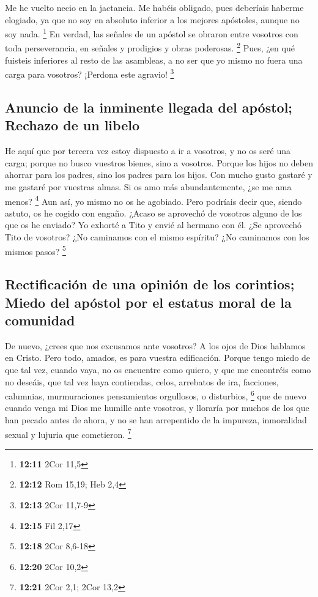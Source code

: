 \begin{paracol}{2}
 Me he vuelto necio en la jactancia. Me habéis obligado,
pues deberíais haberme elogiado, ya que no soy en absoluto inferior a
los mejores apóstoles, aunque no soy nada. \footnote{\textbf{12:11} 2Cor
  11,5}  En verdad, las señales de un apóstol se obraron
entre vosotros con toda perseverancia, en señales y prodigios y obras
poderosas. \footnote{\textbf{12:12} Rom 15,19; Heb 2,4} 
Pues, ¿en qué fuisteis inferiores al resto de las asambleas, a no ser
que yo mismo no fuera una carga para vosotros? ¡Perdona este agravio!
\footnote{\textbf{12:13} 2Cor 11,7-9}

\hypertarget{anuncio-de-la-inminente-llegada-del-apuxf3stol-rechazo-de-un-libelo}{%
\subsection{Anuncio de la inminente llegada del apóstol; Rechazo de un
libelo}\label{anuncio-de-la-inminente-llegada-del-apuxf3stol-rechazo-de-un-libelo}}

 He aquí que por tercera vez estoy dispuesto a ir a
vosotros, y no os seré una carga; porque no busco vuestros bienes, sino
a vosotros. Porque los hijos no deben ahorrar para los padres, sino los
padres para los hijos.  Con mucho gusto gastaré y me
gastaré por vuestras almas. Si os amo más abundantemente, ¿se me ama
menos? \footnote{\textbf{12:15} Fil 2,17}  Aun así, yo
mismo no os he agobiado. Pero podríais decir que, siendo astuto, os he
cogido con engaño.  ¿Acaso se aprovechó de vosotros
alguno de los que os he enviado?  Yo exhorté a Tito y
envié al hermano con él. ¿Se aprovechó Tito de vosotros? ¿No caminamos
con el mismo espíritu? ¿No caminamos con los mismos pasos? \footnote{\textbf{12:18}
  2Cor 8,6-18}

\hypertarget{rectificaciuxf3n-de-una-opiniuxf3n-de-los-corintios-miedo-del-apuxf3stol-por-el-estatus-moral-de-la-comunidad}{%
\subsection{Rectificación de una opinión de los corintios; Miedo del
apóstol por el estatus moral de la
comunidad}\label{rectificaciuxf3n-de-una-opiniuxf3n-de-los-corintios-miedo-del-apuxf3stol-por-el-estatus-moral-de-la-comunidad}}

 De nuevo, ¿crees que nos excusamos ante vosotros? A los
ojos de Dios hablamos en Cristo. Pero todo, amados, es para vuestra
edificación.  Porque tengo miedo de que tal vez, cuando
vaya, no os encuentre como quiero, y que me encontréis como no deseáis,
que tal vez haya contiendas, celos, arrebatos de ira, facciones,
calumnias, murmuraciones pensamientos orgullosos, o disturbios,
\footnote{\textbf{12:20} 2Cor 10,2}  que de nuevo cuando
venga mi Dios me humille ante vosotros, y lloraría por muchos de los que
han pecado antes de ahora, y no se han arrepentido de la impureza,
inmoralidad sexual y lujuria que cometieron. \footnote{\textbf{12:21}
  2Cor 2,1; 2Cor 13,2}


\end{paracol}
